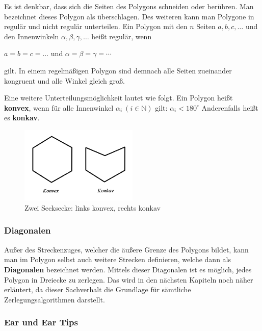 Es ist denkbar, dass sich die Seiten des Polygons schneiden oder berühren. Man bezeichnet dieses Polygon als überschlagen.\cite{polydef}
Des weiteren kann man Polygone in regulär und nicht regulär unterteilen.
Ein Polygon mit den $n$ Seiten $a,b,c, \ldots$  und den Innenwinkeln $\alpha ,\beta ,\gamma ,\ldots$ heißt regulär, wenn

\begin{center}
  $a=b=c=\dots$ und  $\alpha =\beta =\gamma =\dotsb$
\end{center}
gilt. In einem regelmäßigen Polygon sind demnach alle Seiten zueinander kongruent und alle Winkel gleich groß. \cite{regpoly}

Eine weitere Unterteilungsmöglichkeit lautet wie folgt.
Ein Polygon heißt \textbf{konvex}, wenn für alle Innenwinkel $\alpha _i~(i \in \mathbb{N})$ gilt:
  $\alpha _i < 180^\circ$ 
Anderenfalls heißt es \textbf{konkav}. \cite{convex}

\begin{figure}[t]
  \centering
  \includegraphics[width=0.5\textwidth]{bilder/konvex_konkav.png}
  \caption[Zwei Secksecke als Beispiel für konvexe bzw. konkave Polygone]{Zwei Secksecke: links konvex, rechts konkav}
  \label{fig:konvexkonkav}
\end{figure}
\pagebreak 
\subsubsection{Diagonalen}

Außer des Streckenzuges, welcher die äußere Grenze des Polygons bildet, kann man im Polygon selbst auch weitere Strecken definieren, 
welche dann als \textbf{Diagonalen} bezeichnet werden. Mittels dieser Diagonalen ist es möglich, jedes Polygon in Dreiecke zu zerlegen. 
Das wird in den nächsten Kapiteln noch näher erläutert, da dieser Sachverhalt die Grundlage für sämtliche Zerlegungsalgorithmen darstellt. 

\subsubsection{Ear und Ear Tips}

